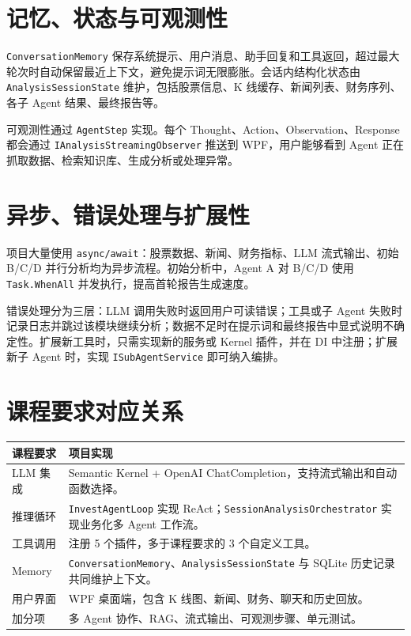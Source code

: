 \documentclass[UTF8,a4paper,11pt]{ctexart}
\begin{document}
\section{记忆、状态与可观测性}
\texttt{ConversationMemory} 保存系统提示、用户消息、助手回复和工具返回，超过最大轮次时自动保留最近上下文，避免提示词无限膨胀。会话内结构化状态由 \texttt{AnalysisSessionState} 维护，包括股票信息、K 线缓存、新闻列表、财务序列、各子 Agent 结果、最终报告等。

可观测性通过 \texttt{AgentStep} 实现。每个 Thought、Action、Observation、Response 都会通过 \texttt{IAnalysisStreamingObserver} 推送到 WPF，用户能够看到 Agent 正在抓取数据、检索知识库、生成分析或处理异常。

\section{异步、错误处理与扩展性}
项目大量使用 \texttt{async/await}：股票数据、新闻、财务指标、LLM 流式输出、初始 B/C/D 并行分析均为异步流程。初始分析中，Agent A 对 B/C/D 使用 \texttt{Task.WhenAll} 并发执行，提高首轮报告生成速度。

错误处理分为三层：LLM 调用失败时返回用户可读错误；工具或子 Agent 失败时记录日志并跳过该模块继续分析；数据不足时在提示词和最终报告中显式说明不确定性。扩展新工具时，只需实现新的服务或 Kernel 插件，并在 DI 中注册；扩展新子 Agent 时，实现 \texttt{ISubAgentService} 即可纳入编排。

\section{课程要求对应关系}
\begin{tabular}{p{3.6cm}p{10.2cm}}
\toprule
课程要求 & 项目实现\\
\midrule
LLM 集成 & Semantic Kernel + OpenAI ChatCompletion，支持流式输出和自动函数选择。\\
推理循环 & \texttt{InvestAgentLoop} 实现 ReAct；\texttt{SessionAnalysisOrchestrator} 实现业务化多 Agent 工作流。\\
工具调用 & 注册 5 个插件，多于课程要求的 3 个自定义工具。\\
Memory & \texttt{ConversationMemory}、\texttt{AnalysisSessionState} 与 SQLite 历史记录共同维护上下文。\\
用户界面 & WPF 桌面端，包含 K 线图、新闻、财务、聊天和历史回放。\\
加分项 & 多 Agent 协作、RAG、流式输出、可观测步骤、单元测试。\\
\bottomrule
\end{tabular}
\end{document}
